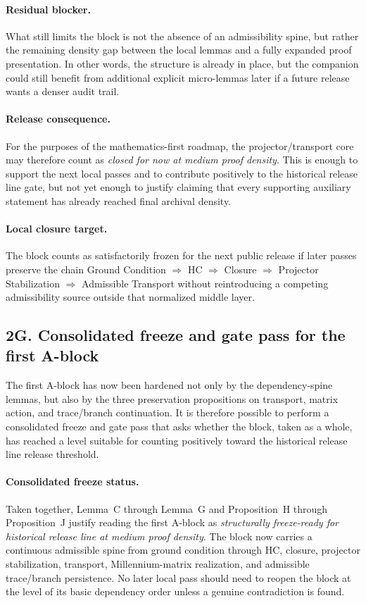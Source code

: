 \documentclass[12pt,a4paper]{article}
\DeclareRobustCommand{\QSCver}[1]{archival stage}
\renewcommand{\QSCver}[1]{historical release line}
\begin{document}
\paragraph{Residual blocker.}
What still limits the block is not the absence of an admissibility spine, but
rather the remaining density gap between the local lemmas and a fully expanded
proof presentation. In other words, the structure is already in place, but the
companion could still benefit from additional explicit micro-lemmas later if a
future release wants a denser audit trail.

\paragraph{Release consequence.}
For the purposes of the mathematics-first roadmap, the projector/transport core
may therefore count as \emph{closed for now at medium proof density}. This is
enough to support the next local passes and to contribute positively to the
\QSCver{v2.27.0} gate, but not yet enough to justify claiming that every supporting
auxiliary statement has already reached final archival density.

\paragraph{Local closure target.}
The block counts as satisfactorily frozen for the next public release if later
passes preserve the chain
Ground Condition $\Rightarrow$ HC $\Rightarrow$ Closure $\Rightarrow$
Projector Stabilization $\Rightarrow$ Admissible Transport
without reintroducing a competing admissibility source outside that normalized
middle layer.



\subsection*{2G. Consolidated freeze and gate pass for the first A-block}
The first A-block has now been hardened not only by the dependency-spine lemmas,
but also by the three preservation propositions on transport, matrix action, and
trace/branch continuation. It is therefore possible to perform a consolidated
freeze and gate pass that asks whether the block, taken as a whole, has reached
a level suitable for counting positively toward the \QSCver{v2.27.0} release threshold.

\paragraph{Consolidated freeze status.}
Taken together, Lemma~C through Lemma~G and Proposition~H through Proposition~J
justify reading the first A-block as \emph{structurally freeze-ready for
\QSCver{v2.27.0} at medium proof density}. The block now carries a continuous admissible
spine from ground condition through HC, closure, projector stabilization,
transport, Millennium-matrix realization, and admissible trace/branch
persistence. No later local pass should need to reopen the block at the level
of its basic dependency order unless a genuine contradiction is found.
\end{document}
